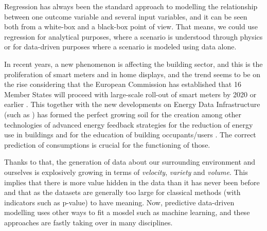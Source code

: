 \documentclass[10pt, conference, compsocconf]{IEEEtran}
\begin{document}

Regression has always been the standard approach to modelling the relationship between one outcome variable  and several input variables, and it can be seen both from a white-box and a black-box point of view. That means, we could use regression for analytical purposes, where a scenario is understood through physics or for data-driven purposes where a scenario is modeled using data alone. 


In recent years, a new phenomenon is affecting the building sector, and this is the proliferation of smart meters and in home displays, and the trend seems to be on the rise considering that the European Commission has established that 16 Member States will proceed with large-scale roll-out of smart meters by 2020 or earlier \cite{ec2014report}. This together with the new developments on Energy Data Infrastructure (such as \cite{terroso2017open, fotopoulou2017providing}) has formed the perfect growing soil for the creation among other technologies of advanced energy feedback strategies for the reduction of energy use in buildings and for the education of building occupants/users \cite{how2017}. The correct prediction of consumptions is crucial for the functioning of those.

Thanks to that, the generation of data about our surrounding environment and ourselves is explosively growing in terms of \emph{velocity}, \emph{variety} and \emph{volume}. This implies that there is more value hidden in the data than it has never been before and that as the datasets are generally too large for classical methods (with indicators such as p-value) to have meaning. Now, predictive data-driven modelling uses other ways to fit a mosdel such as machine learning, and these approaches are fastly taking over in many disciplines.



\end{document}
